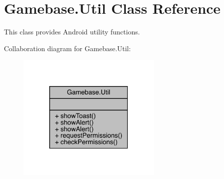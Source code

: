 \hypertarget{classcom_1_1toast_1_1android_1_1gamebase_1_1_gamebase_1_1_util}{}\section{Gamebase.\+Util Class Reference}
\label{classcom_1_1toast_1_1android_1_1gamebase_1_1_gamebase_1_1_util}


This class provides Android utility functions.  




Collaboration diagram for Gamebase.\+Util\+:\nopagebreak
\begin{figure}[H]
\begin{center}
\leavevmode
\includegraphics[width=199pt]{classcom_1_1toast_1_1android_1_1gamebase_1_1_gamebase_1_1_util__coll__graph}
\end{center}
\end{figure}
